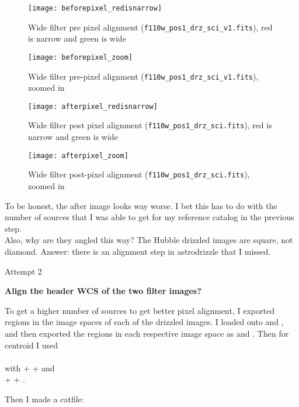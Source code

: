 \documentclass[11pt,obeyspaces]{article} %
\begin{document}
\begin{figure}
\centering
\begin{minipage}[b]{.45\linewidth}
\texttt{[image: beforepixel\_redisnarrow]}
\caption{Wide filter pre pixel alignment ({\tt f110w\_pos1\_drz\_sci\_v1.fits}), red is narrow and green is wide}
\label{fig:beforepixel}
\texttt{[image: beforepixel\_zoom]}
\caption{Wide filter pre-pixel alignment ({\tt f110w\_pos1\_drz\_sci\_v1.fits}), zoomed in}
\label{fig:beforepixelzoom}
\end{minipage}
\quad
\begin{minipage}[b]{.45\linewidth}
\texttt{[image: afterpixel\_redisnarrow]}
\caption{Wide filter post pixel alignment ({\tt f110w\_pos1\_drz\_sci.fits}), red is narrow and green is wide}
\label{fig:afterpixel}
\texttt{[image: afterpixel\_zoom]}
\caption{Wide filter post-pixel alignment ({\tt f110w\_pos1\_drz\_sci.fits}), zoomed in}
\label{fig:afterpixelzoom}
\end{minipage}
\end{figure}

To be honest, the after image looks way worse. I bet this has to do with the number of sources that I was able to get for my reference catalog in the previous step. \\

Also, why are they angled this way? The Hubble drizzled images are square, not diamond. Answer: there is an alignment step in astrodrizzle that I missed. \\

\newpage
\centerline{\sc \Large Attempt 2}
\bigskip
{\large \bf Align the header WCS of the two filter images?}

To get a higher number of sources to get better pixel alignment, I exported regions in the image spaces of each of the drizzled images. I loaded  onto  and , and then exported the regions in each respective image space as  and . Then for centroid I used \\
 \\ 
with  +  +  and \\
 +  + . 

Then I made a catfile:\\
 \\
 \\
\end{document}
